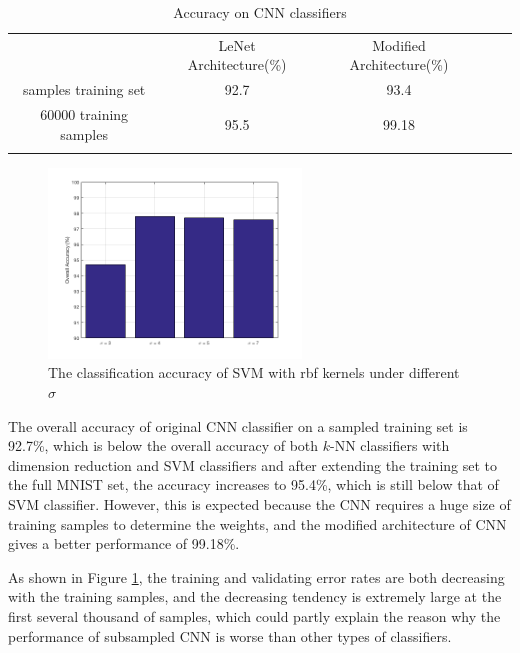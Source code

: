 \documentclass[12pt]{article}
\begin{document}
\begin{table}[]
\centering
\caption{Accuracy on CNN classifiers}
\label{cnnerror}
\begin{tabular}{cccll}
\cline{1-3}
{} & {LeNet Architecture(\%)} & {Modified Architecture(\%)} &  &  \\ \cline{1-3}
{ samples training set} & {92.7} & {93.4} &  &  \\ \cline{1-3}
{60000 training samples} & {95.5} & {99.18} &  &  \\ \cline{1-3}
\multicolumn{1}{l}{} & \multicolumn{1}{l}{} & \multicolumn{1}{l}{} &  & 
\end{tabular}
\end{table}
\begin{figure}[tbp]
	\centering
	\includegraphics[width = 0.6\textwidth]{svm-rbf}		
	\caption{The classification accuracy of SVM with rbf kernels under different $\sigma$}
	\label{fig:svm-rbf}
\end{figure}
The overall accuracy of original CNN classifier on a sampled training set is 92.7\%, which is below the overall accuracy of both $k$-NN classifiers with dimension reduction and SVM classifiers and after extending the training set to the full MNIST set, the accuracy increases to 95.4\%, which is still below that of SVM classifier. However, this is expected because the CNN requires a huge size of training samples to determine the weights, and the modified architecture of CNN gives a better performance of 99.18\%.

As shown in Figure \ref{cnnerror}, the training and validating error rates are both decreasing with the training samples, and the decreasing tendency is extremely large at the first several thousand of samples, which could partly explain the reason why the performance of subsampled CNN is worse than other types of classifiers.
\end{document}
